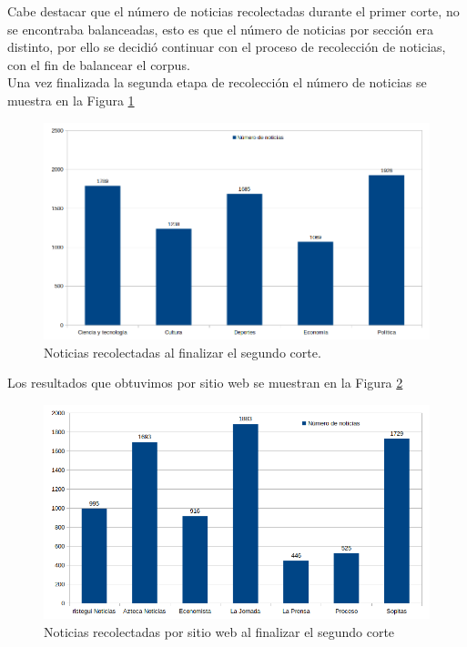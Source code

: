 Cabe destacar que el número de noticias recolectadas durante el primer corte, no se encontraba balanceadas, esto es que el número de noticias por sección era distinto, por ello se decidió continuar con el proceso de recolección de noticias, con el fin de balancear el corpus.\\
Una vez finalizada la segunda etapa de recolección el número de noticias se muestra en la Figura \ref{Fig:notseccion} 

\begin{figure}[H]
	\centering
	\includegraphics[scale=.35]{imagenes/Capitulo5/noticiasPorSeccionV2.png}
	\caption{Noticias recolectadas al finalizar el segundo corte.}
	\label{Fig:notseccion}
\end{figure}

Los resultados que obtuvimos por sitio web se muestran en la Figura \ref{Fig:notPorSit} 

\begin{figure}[H]
	\centering
	\includegraphics[scale=.35]{imagenes/Capitulo5/noticiasPorSitio.png}
	\caption{Noticias recolectadas por sitio web al finalizar el segundo corte}
	\label{Fig:notPorSit}
\end{figure}


